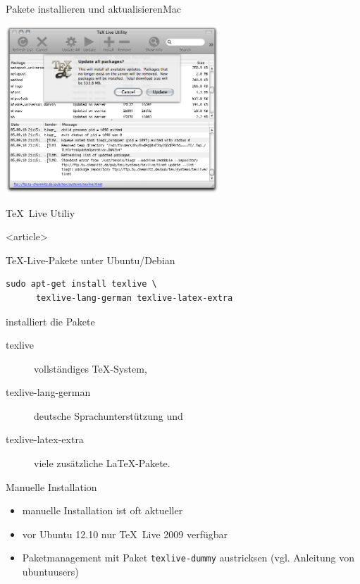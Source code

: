 \begin{Frame}{Pakete installieren und aktualisieren}{Mac}
  \begin{minipage}{\textwidth}\begin{center}
    \includegraphics[width=8cm]{images/mactex-update}

    \TeX\ Live Utiliy
  \end{center}\end{minipage}
\end{Frame}

\mode
<article>

\begin{Frame}[fragile]{\TeX-Live-Pakete unter Ubuntu/Debian}
  \begin{lstlisting}[gobble=4,language={},morekeywords={sudo,apt,get}]
    sudo apt-get install texlive \
      texlive-lang-german texlive-latex-extra
  \end{lstlisting}

  installiert die Pakete

  \begin{description}
    \item[texlive] vollständiges \TeX-System, 
    \item[texlive-lang-german] deutsche Sprachunterstützung und
    \item[texlive-latex-extra] viele zusätzliche \LaTeX-Pakete.
  \end{description}

  \begin{alertblock}{Manuelle Installation}
    \begin{itemize}
      \item manuelle Installation ist oft aktueller
      \item vor Ubuntu 12.10 nur \TeX\ Live 2009 verfügbar
      \item Paketmanagement mit Paket \texttt{texlive-dummy} austricksen
        (vgl. Anleitung von ubuntuusers)
    \end{itemize}
  \end{alertblock}
\end{Frame}

